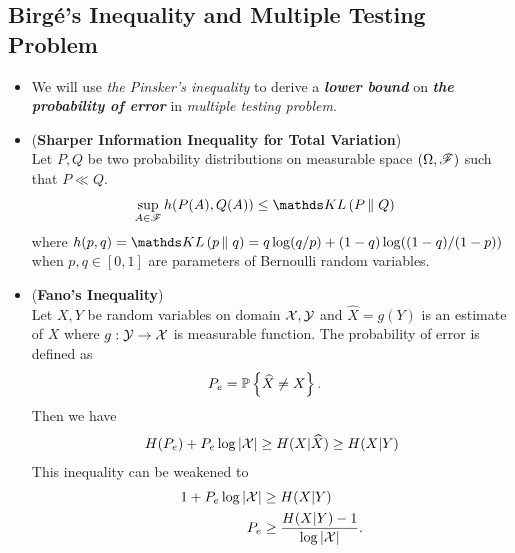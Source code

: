 \documentclass[11pt]{article}
\begin{document}
\subsection{Birg{\'e}'s Inequality and Multiple Testing Problem}
\begin{itemize}
\item \begin{remark}
We will use \emph{the Pinsker's inequality} to derive a \emph{\textbf{lower bound}} on \emph{\textbf{the probability of error}} in \emph{multiple testing problem}.
\end{remark}

\item \begin{proposition} (\textbf{Sharper Information Inequality for Total Variation}) \citep{boucheron2013concentration}\\
Let $P, Q$ be two probability distributions on measurable space $(\Omega, {\mathscr F})$ such that $P \ll Q$.
\begin{align}
\sup_{A \in \srF} h(P(A), Q(A)) &\le \kl{P}{Q} \label{ineqn: total_variation_inequality_duality}
\end{align} where $h(p, q) = \kl{p}{q} = q\log(q/p) + (1-q)\log((1-q)/(1-p))$ when $p,q \in [0, 1]$ are parameters of Bernoulli random variables. 
\end{proposition}

\item \begin{proposition} (\textbf{Fano's Inequality})\citep{thomas2006elements} \\
Let $X, Y$ be random variables on domain ${\mathcal X}, {\mathcal Y}$ and $\widehat{X} = g(Y)$ is an estimate of $X$ where $g: {\mathcal Y} \to {\mathcal X}$ is measurable function. The probability of error is defined as
\begin{align*}
P_{e} &= {\mathbb P}\left\{\widehat{X} \neq X\right\}.
\end{align*} Then we have
\begin{align}
H(P_{e}) + P_{e}\log \left\lvert {\mathcal X} \right\rvert \ge H(X | \widehat{X}) \ge H(X | Y) \label{ineqn: fano_inequality}
\end{align} This inequality can be weakened to
\begin{align}
1+ P_{e}\log \left\lvert {\mathcal X} \right\rvert &\ge H(X|Y) \label{ineqn: fano_inequality_2}\\
P_{e} &\ge \frac{H(X|Y) - 1}{\log \left\lvert {\mathcal X} \right\rvert}.  \label{ineqn: fano_inequality_3}
\end{align}
\end{proposition}


\end{itemize}
\end{document}
